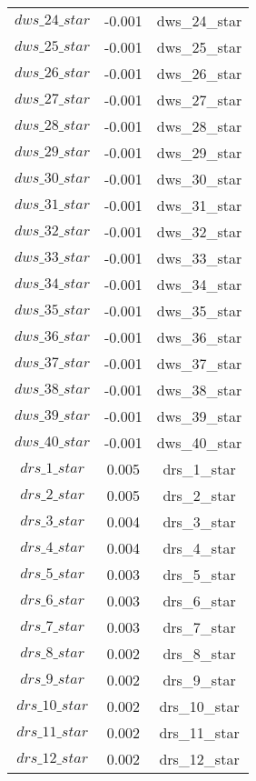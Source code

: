 \begin{center}
\begin{longtable}{ccc}
$dws\_24\_star$ 	 & 	 -0.001 	 & 	 dws\_24\_star\\
$dws\_25\_star$ 	 & 	 -0.001 	 & 	 dws\_25\_star\\
$dws\_26\_star$ 	 & 	 -0.001 	 & 	 dws\_26\_star\\
$dws\_27\_star$ 	 & 	 -0.001 	 & 	 dws\_27\_star\\
$dws\_28\_star$ 	 & 	 -0.001 	 & 	 dws\_28\_star\\
$dws\_29\_star$ 	 & 	 -0.001 	 & 	 dws\_29\_star\\
$dws\_30\_star$ 	 & 	 -0.001 	 & 	 dws\_30\_star\\
$dws\_31\_star$ 	 & 	 -0.001 	 & 	 dws\_31\_star\\
$dws\_32\_star$ 	 & 	 -0.001 	 & 	 dws\_32\_star\\
$dws\_33\_star$ 	 & 	 -0.001 	 & 	 dws\_33\_star\\
$dws\_34\_star$ 	 & 	 -0.001 	 & 	 dws\_34\_star\\
$dws\_35\_star$ 	 & 	 -0.001 	 & 	 dws\_35\_star\\
$dws\_36\_star$ 	 & 	 -0.001 	 & 	 dws\_36\_star\\
$dws\_37\_star$ 	 & 	 -0.001 	 & 	 dws\_37\_star\\
$dws\_38\_star$ 	 & 	 -0.001 	 & 	 dws\_38\_star\\
$dws\_39\_star$ 	 & 	 -0.001 	 & 	 dws\_39\_star\\
$dws\_40\_star$ 	 & 	 -0.001 	 & 	 dws\_40\_star\\
$drs\_1\_star$ 	 & 	 0.005 	 & 	 drs\_1\_star\\
$drs\_2\_star$ 	 & 	 0.005 	 & 	 drs\_2\_star\\
$drs\_3\_star$ 	 & 	 0.004 	 & 	 drs\_3\_star\\
$drs\_4\_star$ 	 & 	 0.004 	 & 	 drs\_4\_star\\
$drs\_5\_star$ 	 & 	 0.003 	 & 	 drs\_5\_star\\
$drs\_6\_star$ 	 & 	 0.003 	 & 	 drs\_6\_star\\
$drs\_7\_star$ 	 & 	 0.003 	 & 	 drs\_7\_star\\
$drs\_8\_star$ 	 & 	 0.002 	 & 	 drs\_8\_star\\
$drs\_9\_star$ 	 & 	 0.002 	 & 	 drs\_9\_star\\
$drs\_10\_star$ 	 & 	 0.002 	 & 	 drs\_10\_star\\
$drs\_11\_star$ 	 & 	 0.002 	 & 	 drs\_11\_star\\
$drs\_12\_star$ 	 & 	 0.002 	 & 	 drs\_12\_star\\

\end{longtable}
\end{center}
